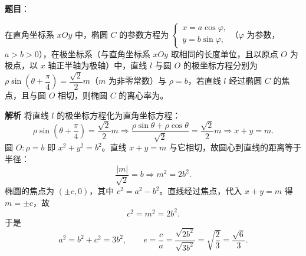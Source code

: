 \begin{answer}

\textbf{题目}：

在直角坐标系 $xOy$ 中，椭圆 $C$ 的参数方程为 $\begin{cases}x=a\cos\varphi,\\y=b\sin\varphi,\end{cases}$（$\varphi$ 为参数，$a>b>0$），在极坐标系（与直角坐标系 $xOy$ 取相同的长度单位，且以原点 $O$ 为极点，以 $x$ 轴正半轴为极轴）中，直线 $l$ 与圆 $O$ 的极坐标方程分别为 $\rho\sin\left(\theta+\dfrac{\pi}{4}\right)=\dfrac{\sqrt2}{2}m$（$m$ 为非零常数）与 $\rho=b$，若直线 $l$ 经过椭圆 $C$ 的焦点，且与圆 $O$ 相切，则椭圆 $C$ 的离心率为\gkblank{}。

\textbf{解析}
将直线 $l$ 的极坐标方程化为直角坐标方程：
\nopagebreak[4]
\[\rho\sin\left(\theta+\frac\pi4\right)=\frac{\sqrt2}{2}m
\Longrightarrow \frac{\rho\sin\theta+\rho\cos\theta}{\sqrt2}=\frac{\sqrt2}{2}m
\Longrightarrow x+y=m.\]
圆 $O:\rho=b$ 即 $x^2+y^2=b^2$。直线 $x+y=m$ 与它相切，故圆心到直线的距离等于半径：
\nopagebreak[4]
\[\frac{|m|}{\sqrt2}=b\Longrightarrow m^2=2b^2.\]
椭圆的焦点为 $(\pm c,0)$，其中 $c^2=a^2-b^2$。直线经过焦点，代入 $x+y=m$ 得 $m=\pm c$，故
\nopagebreak[4]
\[c^2=m^2=2b^2.\]
于是
\nopagebreak[4]
\[a^2=b^2+c^2=3b^2,\qquad
e=\frac ca=\frac{\sqrt{2b^2}}{\sqrt{3b^2}}=\sqrt{\frac23}=\frac{\sqrt6}{3}.\]


\end{answer}

